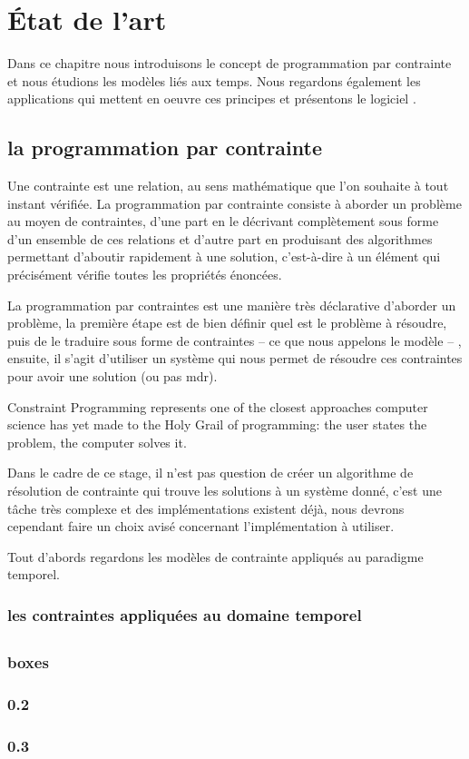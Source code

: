 \chapter{État de l'art}
Dans ce chapitre nous introduisons le concept de programmation par contrainte et nous étudions les modèles liés aux temps. Nous regardons également les applications qui mettent en oeuvre ces principes et présentons le logiciel \iscore{}.
\section{la programmation par contrainte}
\begin{citeauteur}
Une contrainte est une relation, au sens mathématique que l’on souhaite à tout instant vérifiée. La programmation par contrainte consiste à aborder un problème au moyen de contraintes, d’une part en le décrivant complètement sous forme d’un ensemble de ces relations et d’autre part en produisant des algorithmes permettant d’aboutir rapidement à une solution, c'est-à-dire à un élément qui précisément vérifie toutes les propriétés énoncées.
\end{citeauteur}

La programmation par contraintes est une manière très déclarative d'aborder un problème, la première étape est de bien définir quel est le problème à résoudre, puis de le traduire sous forme de contraintes -- ce que nous appelons le modèle -- , ensuite, il s'agit d'utiliser un système qui nous permet de résoudre ces contraintes pour avoir une solution (ou pas mdr).

\begin{citeauteur}
Constraint Programming represents one of the closest approaches computer science has yet made to the Holy Grail of programming: the user states the problem, the computer solves it.
\end{citeauteur}

Dans le cadre de ce stage, il n'est pas question de créer un algorithme de résolution de contrainte qui trouve les solutions à un système donné, c'est une tâche très complexe et des implémentations existent déjà, nous devrons cependant faire un choix avisé concernant l'implémentation à utiliser.

Tout d'abords regardons les modèles de contrainte appliqués au paradigme temporel.

\subsection{les contraintes appliquées au domaine temporel}


\section{\iscore{}}
\subsection{boxes}%
\subsection{0.2}
\subsection{0.3}%
